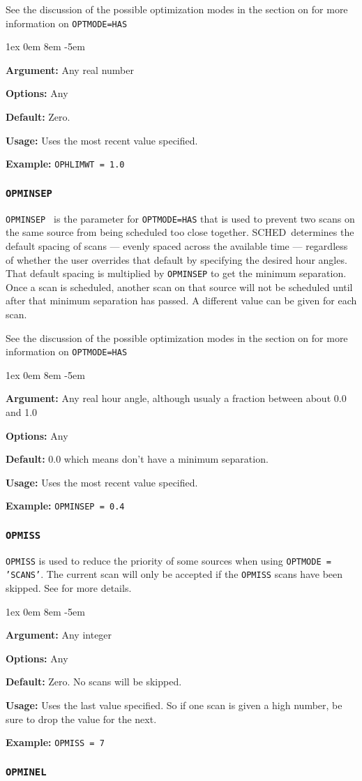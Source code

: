 \documentclass{report}
\newcommand{\schedb}{{\sc SCHED~}}
\newcommand{\rcwbox}[5]{
  \begin{list}{}{\parsep 1ex  \itemsep 0em
                 \leftmargin 8em  \itemindent -5em }
    \item {\bf Argument:} #1
    \item {\bf Options:}  #2
    \item {\bf Default:}  #3
    \item {\bf Usage:}    #4
    \item {\bf Example:}  #5
  \end{list}
}
\begin{document}
See the discussion of the possible optimization modes in the section
on  for more information on
{\tt OPTMODE=HAS}

\rcwbox
{Any real number}
{Any}
{Zero.}
{Uses the most recent value specified.}
{{\tt OPHLIMWT = 1.0 }}

\subsubsection{\label{MP:OPMINSEP}{\tt OPMINSEP}}

{\tt OPMINSEP } is the parameter for {\tt OPTMODE=HAS} that is used
to prevent two scans on the same source from being scheduled too close
together.  \schedb determines the default spacing of scans --- evenly
spaced across the available time --- regardless of whether the user
overrides that default by specifying the desired hour angles.  That
default spacing is multiplied by {\tt OPMINSEP} to get the minimum
separation.  Once a scan is scheduled,
another scan on that source will not be scheduled until after that
minimum separation has passed.  A different value can be given for
each scan.

See the discussion of the possible optimization modes in the section
on  for more information on
{\tt OPTMODE=HAS}

\rcwbox
{Any real hour angle, although usualy a fraction between about 0.0 and 1.0}
{Any}
{0.0 which means don't have a minimum separation.}
{Uses the most recent value specified.}
{{\tt OPMINSEP = 0.4}}

\subsubsection{\label{MP:OPMISS}{\tt OPMISS}}

{\tt OPMISS} is used to reduce the priority of some sources when
using {\tt OPTMODE = 'SCANS'}.  The current scan will only be
accepted if the {\tt OPMISS} scans have been skipped.  See
 for more details.

\rcwbox
{Any integer}
{Any}
{Zero.  No scans will be skipped.}
{Uses the last value specified.  So if one scan is given a high
number, be sure to drop the value for the next.}
{{\tt OPMISS = 7}}

\subsubsection{\label{MP:OPMINEL}{\tt OPMINEL}}
\end{document}
